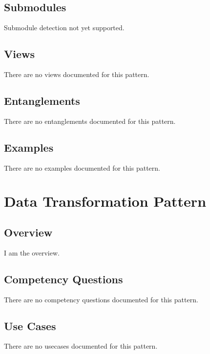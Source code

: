 \subsection{Submodules}
\label{ssec:submodules}
Submodule detection not yet supported.

\subsection{Views}
\label{ssec:views}
There are no views documented for this pattern.


\subsection{Entanglements}
\label{ssec:entanglements}
There are no entanglements documented for this pattern.

\subsection{Examples}
\label{ssec:examples}
There are no examples documented for this pattern.


\section{Data Transformation Pattern}
\label{sec:data-transformation-pattern}
\subsection{Overview}
\label{ssec:overview}
I am the overview.

\subsection{Competency Questions}
\label{ssec:cqs}
There are no competency questions documented for this pattern.

\subsection{Use Cases}
\label{ssec:use-cases}
There are no usecases documented for this pattern.
